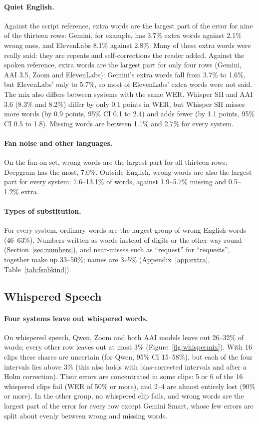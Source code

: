 \documentclass[11pt]{article}
\begin{document}
\paragraph{Quiet English.} Against the script reference, extra words are the largest part of the error for nine of the thirteen rows: Gemini, for example, has 3.7\% extra words against 2.1\% wrong ones, and ElevenLabs 8.1\% against 2.8\%. Many of these extra words were really said: they are repeats and self-corrections the reader added. Against the spoken reference, extra words are the largest part for only four rows (Gemini, AAI 3.5, Zoom and ElevenLabs): Gemini's extra words fall from 3.7\% to 1.6\%, but ElevenLabs' only to 5.7\%, so most of ElevenLabs' extra words were not said. The mix also differs between systems with the same WER. Whisper SH and AAI 3.6 (8.3\% and 8.2\%) differ by only 0.1 points in WER, but Whisper SH misses more words (by 0.9 points, 95\% CI 0.1 to 2.4) and adds fewer (by 1.1 points, 95\% CI 0.5 to 1.8). Missing words are between 1.1\% and 2.7\% for every system.

\paragraph{Fan noise and other languages.} On the fan-on set, wrong words are the largest part for all thirteen rows; Deepgram has the most, 7.0\%. Outside English, wrong words are also the largest part for every system: 7.6--13.1\% of words, against 1.9--5.7\% missing and 0.5--1.2\% extra.

\paragraph{Types of substitution.} For every system, ordinary words are the largest group of wrong English words (46--63\%). Numbers written as words instead of digits or the other way round (Section~\ref{sec:numbers}), and near-misses such as ``request'' for ``requests'', together make up 33--50\%; names are 3--5\% (Appendix~\ref{app:extra}, Table~\ref{tab:fsubkind}).

\subsection{Whispered Speech}\label{sec:whisper}
\paragraph{Four systems leave out whispered words.} On whispered speech, Qwen, Zoom and both AAI models leave out 26--32\% of words; every other row leaves out at most 3\% (Figure~\ref{fig:whispermix}). With 16 clips these shares are uncertain (for Qwen, 95\% CI 15--58\%), but each of the four intervals lies above 3\% (this also holds with bias-corrected intervals and after a Holm correction). Their errors are concentrated in some clips: 5 or 6 of the 16 whispered clips fail (WER of 50\% or more), and 2--4 are almost entirely lost (90\% or more). In the other group, no whispered clip fails, and wrong words are the largest part of the error for every row except Gemini Smart, whose few errors are split about evenly between wrong and missing words.
\end{document}
